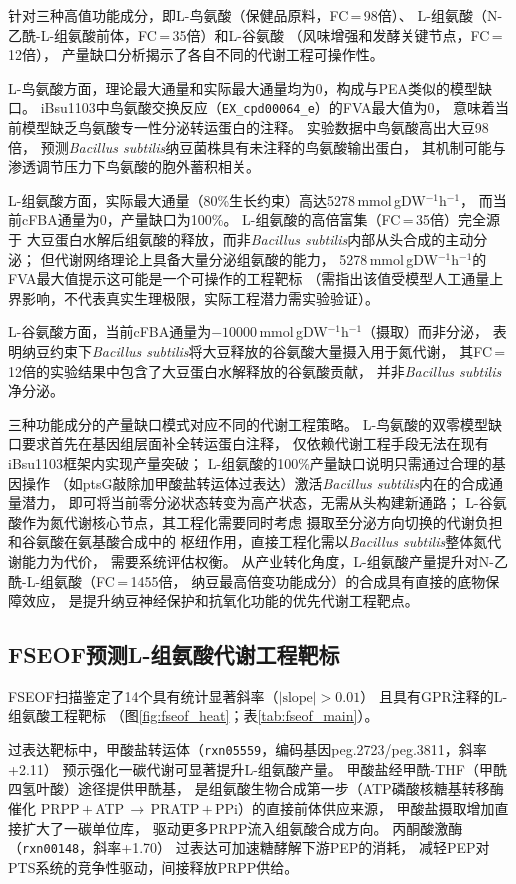\documentclass[10pt, a4paper, twocolumn]{ctexart}
\newcommand{\ibsu}{iBsu1103}
\newcommand{\bs}{\textit{Bacillus subtilis}}
\newcommand{\cfba}{cFBA}
\newcommand{\fseof}{FSEOF}
\newcommand{\mmolg}{mmol\,gDW$^{-1}$h$^{-1}$}
\newcommand{\NAH}{N-乙酰-L-组氨酸}
\begin{document}
针对三种高值功能成分，即L-鸟氨酸（保健品原料，FC\,=\,98倍）、
L-组氨酸（\NAH{}前体，FC\,=\,35倍）和L-谷氨酸
（风味增强和发酵关键节点，FC\,=\,12倍），
产量缺口分析揭示了各自不同的代谢工程可操作性。

L-鸟氨酸方面，理论最大通量和实际最大通量均为0，构成与PEA类似的模型缺口。
\ibsu{}中鸟氨酸交换反应（\texttt{EX\_cpd00064\_e}）的FVA最大值为0，
意味着当前模型缺乏鸟氨酸专一性分泌转运蛋白的注释。
实验数据中鸟氨酸高出大豆98倍，
预测\bs{}纳豆菌株具有未注释的鸟氨酸输出蛋白，
其机制可能与渗透调节压力下鸟氨酸的胞外蓄积相关。

L-组氨酸方面，实际最大通量（80\%生长约束）高达5278\,\mmolg{}，
而当前\cfba{}通量为0，产量缺口为100\%。
L-组氨酸的高倍富集（FC\,=\,35倍）完全源于
大豆蛋白水解后组氨酸的释放，而非\bs{}内部从头合成的主动分泌；
但代谢网络理论上具备大量分泌组氨酸的能力，
5278\,\mmolg{}的FVA最大值提示这可能是一个可操作的工程靶标
（需指出该值受模型人工通量上界影响，不代表真实生理极限，实际工程潜力需实验验证）。

L-谷氨酸方面，当前\cfba{}通量为$-10000$\,\mmolg{}（摄取）而非分泌，
表明纳豆约束下\bs{}将大豆释放的谷氨酸大量摄入用于氮代谢，
其FC\,=\,12倍的实验结果中包含了大豆蛋白水解释放的谷氨酸贡献，
并非\bs{}净分泌。

三种功能成分的产量缺口模式对应不同的代谢工程策略。
L-鸟氨酸的双零模型缺口要求首先在基因组层面补全转运蛋白注释，
仅依赖代谢工程手段无法在现有\ibsu{}框架内实现产量突破；
L-组氨酸的100\%产量缺口说明只需通过合理的基因操作
（如ptsG敲除加甲酸盐转运体过表达）激活\bs{}内在的合成通量潜力，
即可将当前零分泌状态转变为高产状态，无需从头构建新通路；
L-谷氨酸作为氮代谢核心节点，其工程化需要同时考虑
摄取至分泌方向切换的代谢负担和谷氨酸在氨基酸合成中的
枢纽作用，直接工程化需以\bs{}整体氮代谢能力为代价，
需要系统评估权衡。
从产业转化角度，L-组氨酸产量提升对\NAH{}（FC\,=\,1455倍，
纳豆最高倍变功能成分）的合成具有直接的底物保障效应，
是提升纳豆神经保护和抗氧化功能的优先代谢工程靶点。


\subsection{FSEOF预测L-组氨酸代谢工程靶标}

\fseof{}扫描鉴定了14个具有统计显著斜率（$|\text{slope}|>0.01$）
且具有GPR注释的L-组氨酸工程靶标
（图\ref{fig:fseof_heat}；表\ref{tab:fseof_main}）。

过表达靶标中，甲酸盐转运体（\texttt{rxn05559}，编码基因peg.2723/peg.3811，斜率+2.11）
预示强化一碳代谢可显著提升L-组氨酸产量。
甲酸盐经甲酰-THF（甲酰四氢叶酸）途径提供甲酰基，
是组氨酸生物合成第一步（ATP磷酸核糖基转移酶催化
PRPP\,$+$\,ATP\,$\to$\,PRATP\,$+$\,PPi）的直接前体供应来源，
甲酸盐摄取增加直接扩大了一碳单位库，
驱动更多PRPP流入组氨酸合成方向。
丙酮酸激酶（\texttt{rxn00148}，斜率+1.70）
过表达可加速糖酵解下游PEP的消耗，
减轻PEP对PTS系统的竞争性驱动，间接释放PRPP供给。
\end{document}
